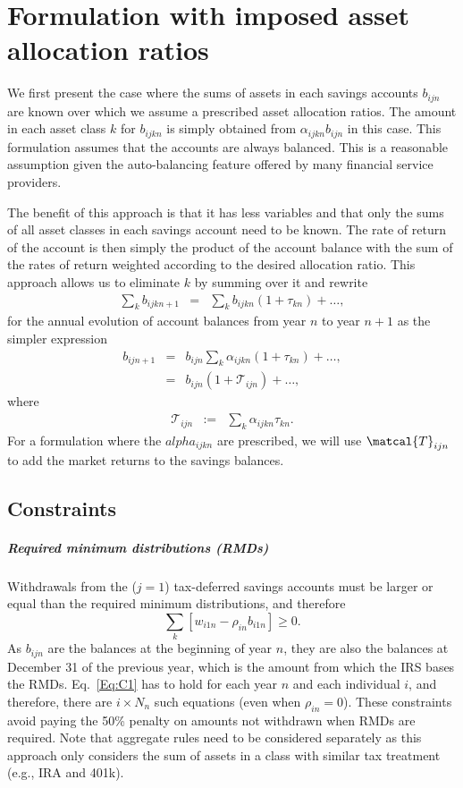 \documentclass{report}[fleqn,12pt]
\begin{document}
\chapter{Formulation with imposed asset allocation ratios}
We first present the case where the sums of assets in each savings accounts $b_{ijn}$ are known
over which we assume a prescribed asset allocation ratios.
The amount in each asset class $k$ for $b_{ijkn}$ is simply obtained
from $\alpha_{ijkn} b_{ijn}$ in this case.
This formulation assumes that the accounts are always balanced. This is
a reasonable assumption given the auto-balancing feature offered by many financial service
providers.

The benefit of this approach is that it has less variables and that only the sums of
all asset classes in each savings account need to be known. The rate of return
of the account is then simply the product of the account balance with the sum of
the rates of return weighted according to the desired allocation ratio.
This approach allows us to eliminate $k$ by summing over it and rewrite
\begin{eqnarray}
	\sum_k b_{ijkn+1} &=& \sum_k b_{ijkn} (1 + \tau_{kn}) + \ldots ,
\end{eqnarray}
for the annual evolution of account balances from year $n$ to year $n+1$
as the simpler expression 
\begin{eqnarray}
	b_{ijn+1} &=& b_{ijn} \sum_k \alpha_{ijkn} (1 + \tau_{kn}) + \ldots ,\nonumber \\
		  &=& b_{ijn} (1 + \mathcal{T}_{ijn}) + \ldots ,
\end{eqnarray}
where
\begin{eqnarray}
	\label{Eq:Tau1}
	\mathcal{T}_{ijn} &:=& \sum_k \alpha_{ijkn} \tau_{kn}.
\end{eqnarray}
For a formulation where the $alpha_{ijkn}$ are prescribed,
we will use $\matcal{T}_{ijn}$ to
add the market returns to the savings balances.

\section{Constraints}
\paragraph*{Required minimum distributions (RMDs)}
	Withdrawals from the ($j=1$) tax-deferred savings accounts must be larger
	or equal than the required minimum distributions, and therefore
	\begin{equation}
		\label{Eq:C1}
		\sum_k [w_{i1n} -  \rho_{in}b_{i1n}] \geq 0.
	\end{equation}
	As $b_{ijn}$ are the balances at the beginning of year $n$, they are also the balances
	at December 31 of the previous year, which is the amount from which the IRS bases the RMDs.
	Eq.~\ref{Eq:C1} has to hold for each year $n$ and each individual $i$, and therefore, there
	are $i\times N_n$ such equations (even when $\rho_{in} = 0$).
	These constraints avoid paying the 50\% penalty
	on amounts not withdrawn when RMDs are required.
	Note that aggregate rules need to be considered separately as this approach only considers
	the sum of assets in a class with similar tax treatment (e.g., IRA and 401k).
\end{document}
